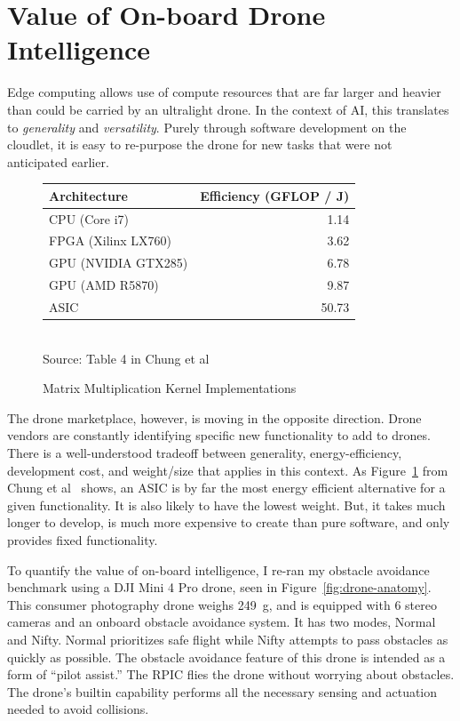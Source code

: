 \section{Value of On-board Drone Intelligence}
\label{sec:djiminipro}

Edge computing allows use of compute resources that are far larger and heavier than could be carried by an ultralight drone.  In the context of AI,
this translates to {\em generality} and {\em versatility}.  Purely
through software development on the cloudlet, it is easy to re-purpose
the drone for new tasks that were not anticipated earlier.

\begin{figure}
\small
\centering
\begin{tabular}{lr}
  \hline
  Architecture & Efficiency (GFLOP / J) \\
  \hline
  CPU (Core i7)        & \phantom{0}1.14  \\
  FPGA (Xilinx LX760)  & \phantom{0}3.62  \\
  GPU (NVIDIA GTX285)  & \phantom{0}6.78  \\
  GPU (AMD R5870)      & \phantom{0}9.87  \\
  ASIC                 & 50.73 \\
  \hline
\end{tabular}
\begin{captext}
\\[0.2cm] \small Source: Table 4 in Chung et al~\cite{Chung2010}
\end{captext}
\caption{Matrix Multiplication Kernel Implementations}
\label{fig:energy2}
\end{figure}

The drone marketplace, however, is moving in the opposite direction.
Drone vendors are constantly identifying specific new functionality to
add to drones. There is a well-understood tradeoff between
generality, energy-efficiency, development cost, and weight/size that
applies in this context. As Figure~\ref{fig:energy2} from Chung et
al~\cite{Chung2010} shows, an ASIC is by far the most energy efficient
alternative for a given functionality.  It is also likely to have the
lowest weight.  But, it takes much longer to develop, is much more
expensive to create than pure software, and only provides fixed
functionality.

To quantify the value of on-board intelligence, I re-ran my obstacle
avoidance benchmark using a DJI Mini 4 Pro drone, seen in Figure~\ref{fig:drone-anatomy}.  This consumer
photography drone weighs 249~g, and is equipped with 6 stereo cameras
and an onboard obstacle avoidance system. It has two modes, Normal and
Nifty. Normal prioritizes safe flight while Nifty attempts to pass
obstacles as quickly as possible.  The obstacle avoidance feature of
this drone is intended as a form of ``pilot assist.''  The RPIC flies
the drone without worrying about obstacles.  The drone's builtin
capability performs all the necessary sensing and actuation needed to
avoid collisions.

